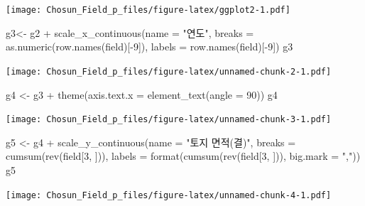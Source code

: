 \documentclass[
]{article}
\newenvironment{Shaded}{\begin{snugshade}}{\end{snugshade}}
\newcommand{\AttributeTok}[1]{\textcolor[rgb]{0.77,0.63,0.00}{#1}}
\newcommand{\DecValTok}[1]{\textcolor[rgb]{0.00,0.00,0.81}{#1}}
\newcommand{\FunctionTok}[1]{\textcolor[rgb]{0.00,0.00,0.00}{#1}}
\newcommand{\NormalTok}[1]{#1}
\newcommand{\OtherTok}[1]{\textcolor[rgb]{0.56,0.35,0.01}{#1}}
\newcommand{\SpecialCharTok}[1]{\textcolor[rgb]{0.00,0.00,0.00}{#1}}
\newcommand{\StringTok}[1]{\textcolor[rgb]{0.31,0.60,0.02}{#1}}
\begin{document}
\texttt{[image: Chosun\_Field\_p\_files/figure-latex/ggplot2-1.pdf]}

\begin{Shaded}
\begin{Highlighting}[]
\NormalTok{g3}\OtherTok{\textless{}{-}}\NormalTok{ g2 }\SpecialCharTok{+} 
  \FunctionTok{scale\_x\_continuous}\NormalTok{(}\AttributeTok{name =} \StringTok{"연도"}\NormalTok{, }
                     \AttributeTok{breaks =} \FunctionTok{as.numeric}\NormalTok{(}\FunctionTok{row.names}\NormalTok{(field)[}\SpecialCharTok{{-}}\DecValTok{9}\NormalTok{]),}
                     \AttributeTok{labels =} \FunctionTok{row.names}\NormalTok{(field)[}\SpecialCharTok{{-}}\DecValTok{9}\NormalTok{])}
\NormalTok{g3}
\end{Highlighting}
\end{Shaded}

\texttt{[image: Chosun\_Field\_p\_files/figure-latex/unnamed-chunk-2-1.pdf]}

\begin{Shaded}
\begin{Highlighting}[]
\NormalTok{g4 }\OtherTok{\textless{}{-}}\NormalTok{ g3 }\SpecialCharTok{+}
  \FunctionTok{theme}\NormalTok{(}\AttributeTok{axis.text.x =} \FunctionTok{element\_text}\NormalTok{(}\AttributeTok{angle =} \DecValTok{90}\NormalTok{))}
\NormalTok{g4}
\end{Highlighting}
\end{Shaded}

\texttt{[image: Chosun\_Field\_p\_files/figure-latex/unnamed-chunk-3-1.pdf]}

\begin{Shaded}
\begin{Highlighting}[]
\NormalTok{g5 }\OtherTok{\textless{}{-}}\NormalTok{ g4 }\SpecialCharTok{+} 
  \FunctionTok{scale\_y\_continuous}\NormalTok{(}\AttributeTok{name =} \StringTok{"토지 면적(결)"}\NormalTok{,}
                     \AttributeTok{breaks =} \FunctionTok{cumsum}\NormalTok{(}\FunctionTok{rev}\NormalTok{(field[}\DecValTok{3}\NormalTok{, ])),}
                     \AttributeTok{labels =} \FunctionTok{format}\NormalTok{(}\FunctionTok{cumsum}\NormalTok{(}\FunctionTok{rev}\NormalTok{(field[}\DecValTok{3}\NormalTok{, ])), }\AttributeTok{big.mark =} \StringTok{","}\NormalTok{))}
\NormalTok{g5}
\end{Highlighting}
\end{Shaded}

\texttt{[image: Chosun\_Field\_p\_files/figure-latex/unnamed-chunk-4-1.pdf]}
\end{document}
